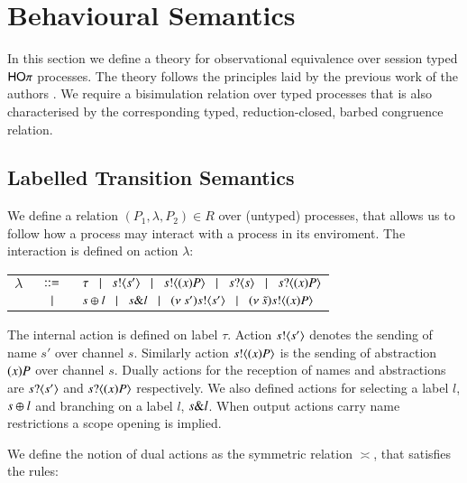 \section{Behavioural Semantics}
\label{sec:beh_sem}

In this section we define a theory for observational equivalence over
session typed $\mathsf{HO}\pi$ processes. The theory follows the principles
laid by the previous work of the authors
\cite{DBLP:conf/forte/KouzapasYH11,KY13,dkphdthesis}.
We require a bisimulation relation over typed processes that
is also characterised by the corresponding typed, reduction-closed,
barbed congruence relation.


\subsection{Labelled Transition Semantics}

We define a relation $(P_1, \lambda, P_2) \in R$ over
(untyped) processes, that allows us to follow how a process may
interact with a process in its enviroment. The interaction
is defined on action $\lambda$:

\begin{tabular}{rcl}
		$\lambda$ &$\;\;::=\;\;$& $\tau \;\;\;|\;\;\; s ! \langle s' \rangle \;\;\;|\;\;\; s ! \langle (x)P \rangle \;\;\;|\;\;\;s ? \langle s \rangle \;\;\;|\;\;\; s ? \langle (x)P \rangle$ \\
		&	$\;\;\;|\;\;\;$ & $s \oplus l \;\;\;|\;\;\; s \& l \;\;\;|\;\;\; (\nu\ s') s ! \langle s' \rangle \;\;\;|\;\;\; (\nu\ \tilde{s}) s ! \langle (x)P \rangle$
\end{tabular}

The internal action is defined on label $\tau$.
Action $s ! \langle s' \rangle$ denotes the sending of name $s'$ over channel $s$.
Similarly action $s ! \langle (x)P \rangle$ is the sending of abstraction $(x)P$
over channel $s$. Dually actions for the reception of names and abstractions are
$s ? \langle s' \rangle$ and $s ? \langle (x)P \rangle$ respectively. We also defined
actions for selecting a label $l$, $s \oplus l$ and branching on a label
$l$, $s \& l$. When output actions carry name restrictions a scope
opening is implied.

We define the notion of dual actions as the symmetric relation $\asymp$, that satisfies the rules:

